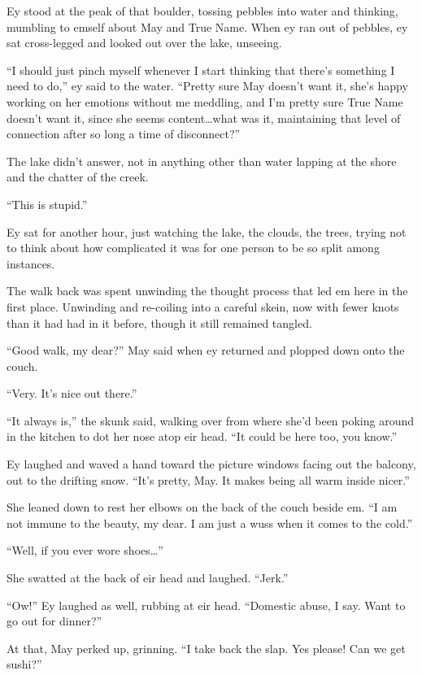 Ey stood at the peak of that boulder, tossing pebbles into water and thinking, mumbling to emself about May and True Name. When ey ran out of pebbles, ey sat cross-legged and looked out over the lake, unseeing.

``I should just pinch myself whenever I start thinking that there's something I need to do,'' ey said to the water. ``Pretty sure May doesn't want it, she's happy working on her emotions without me meddling, and I'm pretty sure True Name doesn't want it, since she seems content\ldots what was it, maintaining that level of connection after so long a time of disconnect?''

The lake didn't answer, not in anything other than water lapping at the shore and the chatter of the creek.

``This is stupid.''

Ey sat for another hour, just watching the lake, the clouds, the trees, trying not to think about how complicated it was for one person to be so split among instances.

The walk back was spent unwinding the thought process that led em here in the first place. Unwinding and re-coiling into a careful skein, now with fewer knots than it had had in it before, though it still remained tangled.

``Good walk, my dear?'' May said when ey returned and plopped down onto the couch.

``Very. It's nice out there.''

``It always is,'' the skunk said, walking over from where she'd been poking around in the kitchen to dot her nose atop eir head. ``It could be here too, you know.''

Ey laughed and waved a hand toward the picture windows facing out the balcony, out to the drifting snow. ``It's pretty, May. It makes being all warm inside nicer.''

She leaned down to rest her elbows on the back of the couch beside em. ``I am not immune to the beauty, my dear. I am just a wuss when it comes to the cold.''

``Well, if you ever wore shoes\ldots{}''

She swatted at the back of eir head and laughed. ``Jerk.''

``Ow!'' Ey laughed as well, rubbing at eir head. ``Domestic abuse, I say. Want to go out for dinner?''

At that, May perked up, grinning. ``I take back the slap. Yes please! Can we get sushi?''

